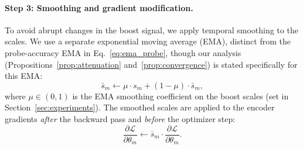 \documentclass{article}
\newcommand{\loss}{\mathcal{L}}
\begin{document}
\paragraph{Step 3: Smoothing and gradient modification.}
To avoid abrupt changes in the boost signal, we apply temporal smoothing to the scales. We use a separate exponential moving average (EMA), distinct from the probe-accuracy EMA in Eq.~\eqref{eq:ema_probe}, though our analysis (Propositions~\ref{prop:attenuation} and~\ref{prop:convergence}) is stated specifically for this EMA:
%
\begin{equation}
\label{eq:ema_scale}
\bar{s}_m \leftarrow \mu \cdot s_m + (1 - \mu) \cdot \bar{s}_m,
\end{equation}
%
where $\mu \in (0,1)$ is the EMA smoothing coefficient on the boost scales (set in Section~\ref{sec:experiments}). The smoothed scales are applied to the encoder gradients \emph{after} the backward pass and \emph{before} the optimizer step:
%
\begin{equation}
\label{eq:gradient_mod}
\frac{\partial \loss}{\partial \theta_m} \leftarrow \bar{s}_m \cdot \frac{\partial \loss}{\partial \theta_m}.
\end{equation}
%
\end{document}
